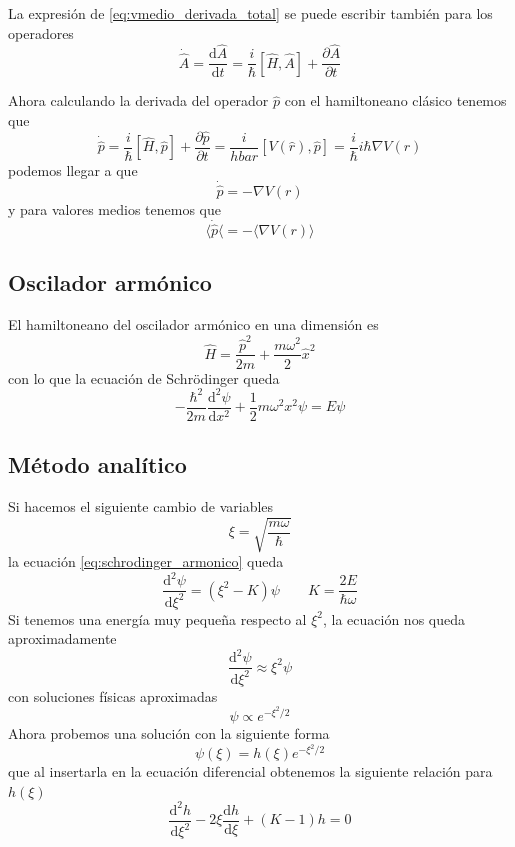 \documentclass{book}
\numberwithin{equation}{section} %
\begin{document}
La expresión de \ref{eq:vmedio_derivada_total} se puede escribir también para los operadores
\begin{equation}
    \dot{\hat{A}} = \frac{\mathrm{d} \hat{A}}{\mathrm{d} t} = \frac{i}{\hbar} [\hat{H},\hat{A}] + \frac{\partial \hat{A}}{\partial t}
    \label{eq:operador_derivada_total}
\end{equation}

Ahora calculando la derivada del operador $\hat{p}$ con el hamiltoneano clásico tenemos que
\[ \dot{\hat{p}} = \frac{i}{\hbar} [\hat{H}, \hat{p}] + \frac{\partial \hat{p}}{\partial t} = \frac{i}{hbar} [V(\hat{r}), \hat{p}] = \frac{i}{\hbar} i \hbar \nabla V(r)\]
podemos llegar a que 
\begin{equation}
    \dot{\hat{p}} = -\nabla V(r)
    \label{eq:operador_newton}
\end{equation}
y para valores medios tenemos que
\begin{equation}
    \langle \dot{\hat{p}} \langle = - \langle \nabla V(r) \rangle
    \label{eq:ehrenfest}
\end{equation}

\subsection{Oscilador armónico}

El hamiltoneano del oscilador armónico en una dimensión es
\begin{equation}
\hat{H} = \frac{\hat{p}^2}{2m} + \frac{m \omega^2}{2} \hat{x}^2
\end{equation}
con lo que la ecuación de Schrödinger queda
\begin{equation}
    -\frac{\hbar^2}{2m} \frac{\mathrm{d}^2\psi}{\mathrm{d}x^2} + \frac{1}{2} m \omega^2 x^2 \psi = E \psi
    \label{eq:schrodinger_armonico}
\end{equation}

\subsection{Método analítico}
Si hacemos el siguiente cambio de variables
\begin{equation}
    \xi = \sqrt{\frac{m \omega}{\hbar}} 
\end{equation}
la ecuación \ref{eq:schrodinger_armonico} queda 
\begin{equation}
    \frac{\mathrm{d}^2\psi}{\mathrm{d}\xi^2} = (\xi^2  - K) \psi  \qquad K = \frac{2 E}{\hbar \omega}
\end{equation}
Si tenemos una energía muy pequeña respecto al $\xi^2$, la ecuación nos queda aproximadamente
\[  \frac{\mathrm{d}^2\psi}{\mathrm{d}\xi^2} \approx \xi^2 \psi \] 
con soluciones físicas aproximadas
\[ \psi \propto e^{-\xi^2/2} \]
Ahora probemos una solución con la siguiente forma
\begin{equation}
    \psi(\xi) = h(\xi) e^{-\xi^2/2}
\end{equation}
que al insertarla en la ecuación diferencial obtenemos la siguiente relación para $h(\xi)$
\begin{equation}
    \frac{\mathrm{d}^2 h}{\mathrm{d} \xi^2} - 2 \xi \frac{\mathrm{d} h}{\mathrm{d}\xi} + (K - 1) h = 0
\end{equation}
\end{document}
